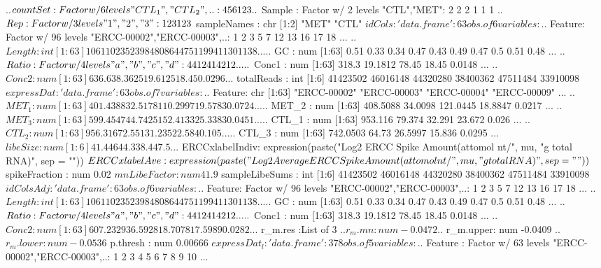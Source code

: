 \documentclass{article}
\begin{document}
\begin{Schunk}
\begin{Soutput}
  ..$ countSet: Factor w/ 6 levels "CTL_1","CTL_2",..: 4 5 6 1 2 3
  ..$ Sample  : Factor w/ 2 levels "CTL","MET": 2 2 2 1 1 1
  ..$ Rep     : Factor w/ 3 levels "1","2","3": 1 2 3 1 2 3
 $ sampleNames    : chr [1:2] "MET" "CTL"
 $ idCols         :'data.frame':	63 obs. of  6 variables:
  ..$ Feature: Factor w/ 96 levels "ERCC-00002","ERCC-00003",..: 1 2 3 5 7 12 13 16 17 18 ...
  ..$ Length : int [1:63] 1061 1023 523 984 808 644 751 1994 1130 1138 ...
  ..$ GC     : num [1:63] 0.51 0.33 0.34 0.47 0.43 0.49 0.47 0.5 0.51 0.48 ...
  ..$ Ratio  : Factor w/ 4 levels "a","b","c","d": 4 4 1 2 4 1 4 2 1 2 ...
  ..$ Conc1  : num [1:63] 318.3 19.1812 78.45 18.45 0.0148 ...
  ..$ Conc2  : num [1:63] 636.6 38.3625 19.6125 18.45 0.0296 ...
 $ totalReads     : int [1:6] 41423502 46016148 44320280 38400362 47511484 33910098
 $ expressDat     :'data.frame':	63 obs. of  7 variables:
  ..$ Feature: chr [1:63] "ERCC-00002" "ERCC-00003" "ERCC-00004" "ERCC-00009" ...
  ..$ MET_1  : num [1:63] 401.4388 32.5178 110.2997 19.5783 0.0724 ...
  ..$ MET_2  : num [1:63] 408.5088 34.0098 121.0445 18.8847 0.0217 ...
  ..$ MET_3  : num [1:63] 599.4547 44.7425 152.4133 25.3383 0.0451 ...
  ..$ CTL_1  : num [1:63] 953.116 79.374 32.291 23.672 0.026 ...
  ..$ CTL_2  : num [1:63] 956.316 72.551 31.235 22.584 0.105 ...
  ..$ CTL_3  : num [1:63] 742.0503 64.73 26.5997 15.836 0.0295 ...
 $ libeSize       : num [1:6] 41.4 46 44.3 38.4 47.5 ...
 $ ERCCxlabelIndiv:  expression(paste("Log2 ERCC Spike Amount(attomol nt/",      mu, "g total RNA)", sep = ""))
 $ ERCCxlabelAve  :  expression(paste("Log2 Average ERCC Spike Amount(attomol nt/",      mu, "g total RNA)", sep = ""))
 $ spikeFraction  : num 0.02
 $ mnLibeFactor   : num 41.9
 $ sampleLibeSums : int [1:6] 41423502 46016148 44320280 38400362 47511484 33910098
 $ idColsAdj      :'data.frame':	63 obs. of  6 variables:
  ..$ Feature: Factor w/ 96 levels "ERCC-00002","ERCC-00003",..: 1 2 3 5 7 12 13 16 17 18 ...
  ..$ Length : int [1:63] 1061 1023 523 984 808 644 751 1994 1130 1138 ...
  ..$ GC     : num [1:63] 0.51 0.33 0.34 0.47 0.43 0.49 0.47 0.5 0.51 0.48 ...
  ..$ Ratio  : Factor w/ 4 levels "a","b","c","d": 4 4 1 2 4 1 4 2 1 2 ...
  ..$ Conc1  : num [1:63] 318.3 19.1812 78.45 18.45 0.0148 ...
  ..$ Conc2  : num [1:63] 607.2329 36.5928 18.7078 17.5989 0.0282 ...
 $ r_m.res        :List of 3
  ..$ r_m.mn   : num -0.0472
  ..$ r_m.upper: num -0.0409
  ..$ r_m.lower: num -0.0536
 $ p.thresh       : num 0.00666
 $ expressDat_l   :'data.frame':	378 obs. of  5 variables:
  ..$ Feature   : Factor w/ 63 levels "ERCC-00002","ERCC-00003",..: 1 2 3 4 5 6 7 8 9 10 ...

\end{Soutput}
\end{Schunk}
\end{document}
